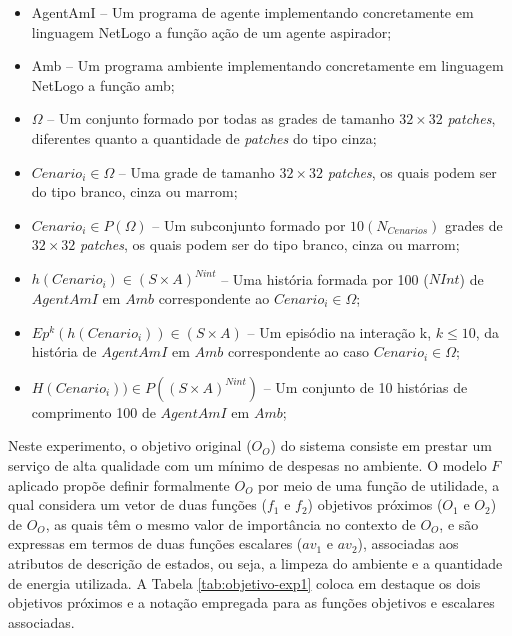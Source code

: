 \begin{itemize}
    \item AgentAmI -- Um programa de agente implementando concretamente em linguagem NetLogo a função ação de um agente aspirador;
    
    \item Amb -- Um programa ambiente implementando concretamente em linguagem NetLogo a função amb;

    
    \item $\Omega$ -- Um conjunto formado por todas as grades de tamanho $32 \times 32$ \textit{patches}, diferentes quanto a quantidade de \textit{patches} do tipo cinza;
    
    \item $Cenario_i \in \Omega$ -- Uma grade de tamanho $32 \times 32$ \textit{patches}, os quais podem ser do tipo branco, cinza ou marrom; 
    
    \item $Cenario_i \in P(\Omega)$ -- Um subconjunto formado por $10 (N_{Cenarios})$ grades de $32 \times 32$ \textit{patches}, os quais podem ser do tipo branco, cinza ou marrom;
    
    \item $h(Cenario_i) \in (S\times A)^{Nint}$ -- Uma história formada por 100 ($NInt$) de $AgentAmI$ em $Amb$ correspondente ao $Cenario_i \in \Omega$; 
    
    \item $Ep^k(h(Cenario_i)) \in (S\times A)$ -- Um episódio na interação k, $k \leq 10$, da história de $AgentAmI$ em $Amb$ correspondente ao caso $Cenario_i \in \Omega$;
    
    \item $H(Cenario_i)) \in P((S\times A)^{Nint})$ -- Um conjunto de 10 histórias de comprimento 100 de $AgentAmI$ em $Amb$;
    
\end{itemize}

Neste experimento, o objetivo original ($O_O$) do sistema consiste em prestar um serviço de alta qualidade com um mínimo de despesas no ambiente. O modelo $F$ aplicado propõe definir formalmente $O_O$ por meio de uma função de utilidade, a qual considera um vetor de duas funções ($f_1$ e $f_2$) objetivos próximos ($O_1$ e $O_2$) de $O_O$, as quais têm o mesmo valor de importância no contexto de $O_O$, e são expressas em termos de duas funções escalares ($av_1$ e $av_2$), associadas aos atributos de descrição de estados, ou seja, a limpeza do ambiente e a quantidade de energia utilizada. A Tabela \ref{tab:objetivo-exp1} coloca em destaque os dois objetivos próximos e a notação empregada para as funções objetivos e escalares associadas.

